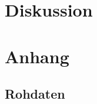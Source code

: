 \documentclass[10pt,a4paper]{article}
\begin{document}
	\section{Diskussion}

	\section{Anhang}
	\subsection{Rohdaten}


	
\end{document}
